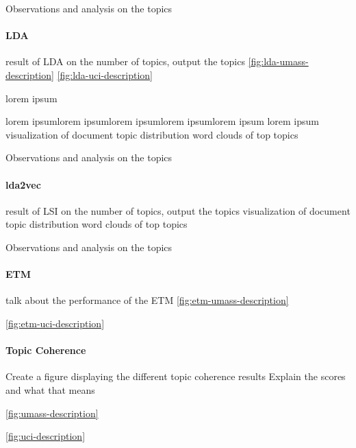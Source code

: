 \documentclass[letterpaper,12pt]{article}
\begin{document}
Observations and analysis on the topics

\paragraph{LDA}
result of LDA on the number of topics, output the topics
\ref{fig:lda-umass-description}
\ref{fig:lda-uci-description}

lorem ipsum

lorem ipsumlorem ipsumlorem ipsumlorem ipsumlorem ipsum
lorem ipsum
\newpage
visualization of document topic distribution
word clouds of top topics

Observations and analysis on the topics

\paragraph{lda2vec}
result of LSI on the number of topics, output the topics
visualization of document topic distribution
word clouds of top topics

Observations and analysis on the topics

\paragraph{ETM}

talk about the performance of the ETM
\ref{fig:etm-umass-description}

\ref{fig:etm-uci-description}
\newpage

\paragraph{Topic Coherence}
Create a figure displaying the different topic coherence results
Explain the scores and what that means

\ref{fig:umass-description}

\ref{fig:uci-description}
\end{document}
